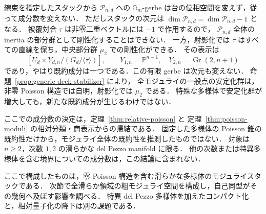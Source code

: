 \begin{remark}
\label{rem:components-rigidification}
線束を指定したスタックから $\mathcal P_{n,d}$ への
$\mathbb G_m$-gerbe は台の位相空間を変えず，従って成分数を変えない．
ただしスタックの次元は $\dim\widetilde{\mathcal P}_{n,d}
=\dim\mathcal P_{n,d}-1$ となる．
被覆対合 $\tau$ は非零二重ベクトルには $-1$ で作用するので，
$\mathcal P_{n,d}$ 全体の inertia の部分群として剛性化することはできない．
一方，射影化では $\tau$ はすべての直線を保ち，中央部分群 $\mu_2$ での剛性化ができる．
その表示は
\[
 [U_d\times Y_{d,n}/(G_d/\langle\tau\rangle)],\qquad
 Y_{1,n}=\mathbb P^{n-1},\quad Y_{2,n}=\operatorname{Gr}(2,n+1)
\]
であり，やはり既約成分は一つである．この有限 gerbe は次元も変えない．
命題~\ref{prop:generic-deck-stabilizer} により，
全モジュライの一般点の安定化群は，非零 Poisson 構造では自明，射影化では $\mu_2$ である．
特殊な多様体で安定化群が増大しても，新たな既約成分が生じるわけではない．

ここでの成分数の決定は，定理~\ref{thm:relative-poisson} と
定理~\ref{thm:poisson-moduli} の相対分類・商表示からの帰結である．
固定した多様体の Poisson 錐の既約性だけから，モジュライ全体の既約性を推測したものではない．
対象は $n\ge2$，次数 $1,2$ の滑らかな del Pezzo manifold に限る．
他の次数または特異多様体を含む境界についての成分数は，この結論に含まれない．
\end{remark}

ここで構成したものは，零 Poisson 構造を含む滑らかな多様体のモジュライスタックである．
次節で全滑らか領域の粗モジュライ空間を構成し，自己同型がその幾何へ及ぼす影響を調べる．
特異 del Pezzo 多様体を加えたコンパクト化と，相対量子化の降下は別の課題である．

